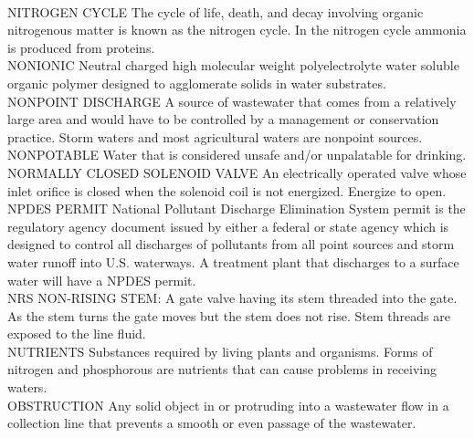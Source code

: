 \vspace{0.3cm}\\
NITROGEN CYCLE
The cycle of life, death, and decay involving organic nitrogenous matter is known as the nitrogen cycle. In the nitrogen cycle ammonia is produced from proteins.
\vspace{0.3cm}\\
NONIONIC
Neutral charged high molecular weight polyelectrolyte water soluble organic polymer designed to agglomerate solids in water substrates.
\vspace{0.3cm}\\
NONPOINT DISCHARGE
A source of wastewater that comes from a relatively large area and would have to be controlled by a management or conservation practice. Storm waters and most agricultural waters are nonpoint sources.
\vspace{0.3cm}\\
NONPOTABLE
Water that is considered unsafe and/or unpalatable for drinking.
\vspace{0.3cm}\\
NORMALLY CLOSED SOLENOID VALVE
An electrically operated valve whose inlet orifice is closed when the solenoid coil is not energized. Energize to open.
\vspace{0.3cm}\\
NPDES PERMIT
National Pollutant Discharge Elimination System permit is the regulatory agency document issued by either a federal or state agency which is designed to control all discharges of pollutants from all point sources and storm water runoff into U.S. waterways. A treatment plant that discharges to a surface water will have a NPDES permit.
\vspace{0.3cm}\\
NRS
NON-RISING STEM:  A gate valve having its stem threaded into the gate. As the stem turns the gate moves but the stem does not rise. Stem threads are exposed to the line fluid.
\vspace{0.3cm}\\
NUTRIENTS
Substances required by living plants and organisms. Forms of nitrogen and phosphorous are nutrients that can cause problems in receiving waters.
\vspace{0.3cm}\\
OBSTRUCTION
Any solid object in or protruding into a wastewater flow in a collection line that prevents a smooth or even passage of the wastewater. 
\vspace{0.3cm}\\

